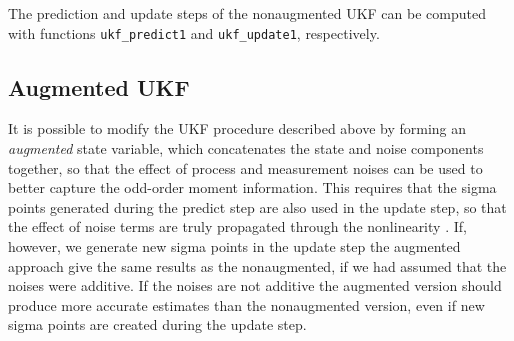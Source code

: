 The prediction and update steps of the nonaugmented UKF can be
computed with functions \texttt{ukf\_predict1} and
\texttt{ukf\_update1}, respectively.

\subsection{Augmented UKF}

It is possible to modify the UKF procedure described above by forming
an {\it augmented} state variable, which concatenates the state and
noise components together, so that the effect of process and
measurement noises can be used to better capture the odd-order moment
information. This requires that the sigma points generated during the
predict step are also used in the update step, so that the effect of
noise terms are truly propagated through the nonlinearity \citep{Wu+Hu+Wu+Hu:2005}. If, however, we generate new sigma points in the update step
the augmented approach give the same results as the nonaugmented, if
we had assumed that the noises were additive. If the noises are not
additive the augmented version should produce more accurate estimates
than the nonaugmented version, even if new sigma points are created
during the update step.

